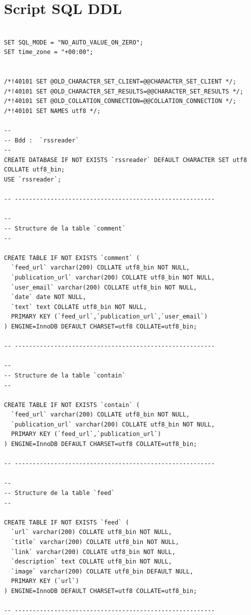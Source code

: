 \documentclass[a4paper,10pt]{article}
\begin{document}
\section{Script SQL DDL}
\begin{lstlisting}

SET SQL_MODE = "NO_AUTO_VALUE_ON_ZERO";
SET time_zone = "+00:00";


/*!40101 SET @OLD_CHARACTER_SET_CLIENT=@@CHARACTER_SET_CLIENT */;
/*!40101 SET @OLD_CHARACTER_SET_RESULTS=@@CHARACTER_SET_RESULTS */;
/*!40101 SET @OLD_COLLATION_CONNECTION=@@COLLATION_CONNECTION */;
/*!40101 SET NAMES utf8 */;

--
-- Bdd :  `rssreader`
--
CREATE DATABASE IF NOT EXISTS `rssreader` DEFAULT CHARACTER SET utf8 COLLATE utf8_bin;
USE `rssreader`;

-- --------------------------------------------------------

--
-- Structure de la table `comment`
--

CREATE TABLE IF NOT EXISTS `comment` (
  `feed_url` varchar(200) COLLATE utf8_bin NOT NULL,
  `publication_url` varchar(200) COLLATE utf8_bin NOT NULL,
  `user_email` varchar(200) COLLATE utf8_bin NOT NULL,
  `date` date NOT NULL,
  `text` text COLLATE utf8_bin NOT NULL,
  PRIMARY KEY (`feed_url`,`publication_url`,`user_email`)
) ENGINE=InnoDB DEFAULT CHARSET=utf8 COLLATE=utf8_bin;

-- --------------------------------------------------------

--
-- Structure de la table `contain`
--

CREATE TABLE IF NOT EXISTS `contain` (
  `feed_url` varchar(200) COLLATE utf8_bin NOT NULL,
  `publication_url` varchar(200) COLLATE utf8_bin NOT NULL,
  PRIMARY KEY (`feed_url`,`publication_url`)
) ENGINE=InnoDB DEFAULT CHARSET=utf8 COLLATE=utf8_bin;

-- --------------------------------------------------------

--
-- Structure de la table `feed`
--

CREATE TABLE IF NOT EXISTS `feed` (
  `url` varchar(200) COLLATE utf8_bin NOT NULL,
  `title` varchar(200) COLLATE utf8_bin NOT NULL,
  `link` varchar(200) COLLATE utf8_bin NOT NULL,
  `description` text COLLATE utf8_bin NOT NULL,
  `image` varchar(200) COLLATE utf8_bin DEFAULT NULL,
  PRIMARY KEY (`url`)
) ENGINE=InnoDB DEFAULT CHARSET=utf8 COLLATE=utf8_bin;

-- --------------------------------------------------------


\end{lstlisting}
\end{document}
